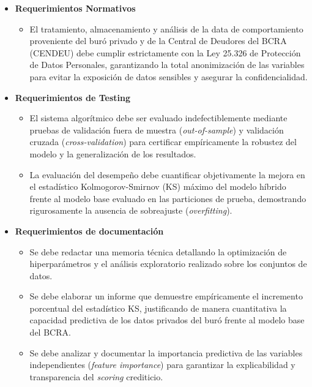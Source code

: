 \documentclass[
11pt, %
]{charter}
\begin{document}
\begin{itemize}
    \item \textbf{Requerimientos Normativos}
    \begin{itemize}
        \item El tratamiento, almacenamiento y análisis de la data de comportamiento proveniente del buró privado y de la Central de Deudores del BCRA (CENDEU) debe cumplir estrictamente con la Ley 25.326 de Protección de Datos Personales, garantizando la total anonimización de las variables para evitar la exposición de datos sensibles y asegurar la confidencialidad.
    \end{itemize}

    \item \textbf{Requerimientos de Testing}
    \begin{itemize}
        \item El sistema algorítmico debe ser evaluado indefectiblemente mediante pruebas de validación fuera de muestra (\textit{out-of-sample}) y validación cruzada (\textit{cross-validation}) para certificar empíricamente la robustez del modelo y la generalización de los resultados.
        \item La evaluación del desempeño debe cuantificar objetivamente la mejora en el estadístico Kolmogorov-Smirnov (KS) máximo del modelo híbrido frente al modelo base evaluado en las particiones de prueba, demostrando rigurosamente la ausencia de sobreajuste (\textit{overfitting}).
    \end{itemize}

    \item \textbf{Requerimientos de documentación}
    \begin{itemize}
        \item Se debe redactar una memoria técnica detallando la optimización de hiperparámetros y el análisis exploratorio realizado sobre los conjuntos de datos.
        \item Se debe elaborar un informe que demuestre empíricamente el incremento porcentual del estadístico KS, justificando de manera cuantitativa la capacidad predictiva de los datos privados del buró frente al modelo base del BCRA.
        \item Se debe analizar y documentar la importancia predictiva de las variables independientes (\textit{feature importance}) para garantizar la explicabilidad y transparencia del \textit{scoring} crediticio.
    \end{itemize}

\end{itemize}
\end{document}
